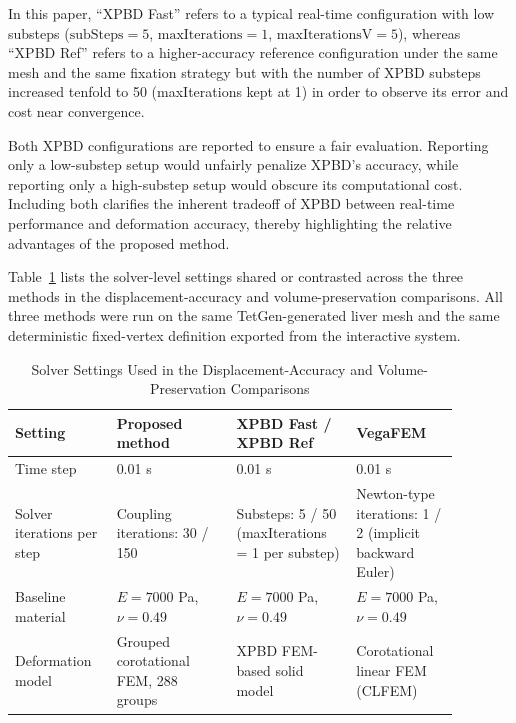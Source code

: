 \documentclass{ieeeaccess}
\begin{document}
In this paper, ``XPBD Fast'' refers to a typical real-time configuration with low substeps ($\text{subSteps}=5$, $\text{maxIterations}=1$, $\text{maxIterationsV}=5$), whereas ``XPBD Ref'' refers to a higher-accuracy reference configuration under the same mesh and the same fixation strategy but with the number of XPBD substeps increased tenfold to 50 (maxIterations kept at 1) in order to observe its error and cost near convergence.

Both XPBD configurations are reported to ensure a fair evaluation. Reporting only a low-substep setup would unfairly penalize XPBD's accuracy, while reporting only a high-substep setup would obscure its computational cost. Including both clarifies the inherent tradeoff of XPBD between real-time performance and deformation accuracy, thereby highlighting the relative advantages of the proposed method.

Table~\ref{tab:repro} lists the solver-level settings shared or contrasted across the three methods in the displacement-accuracy and volume-preservation comparisons. All three methods were run on the same TetGen-generated liver mesh and the same deterministic fixed-vertex definition exported from the interactive system.

\begin{table}[htbp]
\caption{Solver Settings Used in the Displacement-Accuracy and Volume-Preservation Comparisons}
\label{tab:repro}
\centering
\scriptsize
\renewcommand{\arraystretch}{1.15}
\setlength{\tabcolsep}{2pt}
\begin{tabular}{|p{0.20\linewidth}|p{0.24\linewidth}|p{0.24\linewidth}|p{0.20\linewidth}|}
\hline
Setting & Proposed method & XPBD Fast / XPBD Ref & VegaFEM \\
\hline
Time step & 0.01 s & 0.01 s & 0.01 s \\
\hline
Solver iterations per step & Coupling iterations: 30 / 150 & Substeps: 5 / 50 (maxIterations = 1 per substep) & Newton-type iterations: 1 / 2 (implicit backward Euler) \\
\hline
Baseline material & $E=7000$ Pa, $\nu=0.49$ & $E=7000$ Pa, $\nu=0.49$ & $E=7000$ Pa, $\nu=0.49$ \\
\hline
Deformation model & Grouped corotational FEM, 288 groups & XPBD FEM-based solid model & Corotational linear FEM (CLFEM) \\
\hline
\end{tabular}
\end{table}
\end{document}
